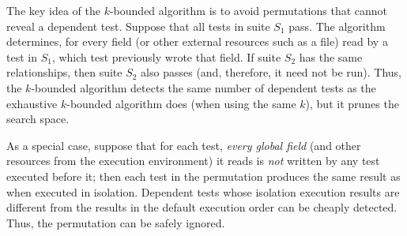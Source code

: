 %
%
%




The key idea of the \dependenceaware{} $k$-bounded algorithm
is to avoid permutations that cannot reveal a dependent test.
Suppose that all tests in suite $S_1$ pass.  The algorithm determines, for
every field (or other external resources such as a file)
read by a test in $S_1$, which test previously wrote that field.
If suite $S_2$ has the same relationships, then suite $S_2$ also passes
(and, therefore, it need not be run).
Thus, the \dependenceaware{} $k$-bounded algorithm
detects the same number of dependent tests
as the exhaustive $k$-bounded algorithm does (when using the same $k$),
but it prunes the search space.



As a special case, suppose that for each test,
\textit{every global field} (and other 
resources from the execution environment) it reads
is \textit{not} written by any test executed before it; then
each test in the permutation produces
the same result as when executed in isolation.
Dependent tests whose isolation execution results
are different from the results in the default execution order
can be cheaply detected.
Thus, the permutation can be safely ignored. 

